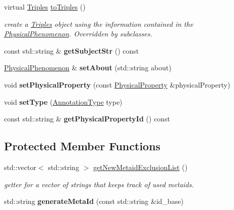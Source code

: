 \begin{DoxyCompactItemize}
virtual \hyperlink{classomexmeta_1_1Triples}{Triples} \hyperlink{classomexmeta_1_1PhysicalPhenomenon_a30617e685bd8b155a76d38ab5a9db273}{to\+Triples} ()
\begin{DoxyCompactList}\small\item\em create a \hyperlink{classomexmeta_1_1Triples}{Triples} object using the information contained in the \hyperlink{classomexmeta_1_1PhysicalPhenomenon}{Physical\+Phenomenon}. Overridden by subclasses. \end{DoxyCompactList}\item 
\mbox{\label{classomexmeta_1_1PhysicalPhenomenon_ae99e667cbceff2da0c4c0f5c64a8ba8f}} 
const std\+::string \& {\bfseries get\+Subject\+Str} () const
\item 
\mbox{\label{classomexmeta_1_1PhysicalPhenomenon_a0a9c54b0c4bfad62b618766474dc70f8}} 
\hyperlink{classomexmeta_1_1PhysicalPhenomenon}{Physical\+Phenomenon} \& {\bfseries set\+About} (std\+::string about)
\item 
\mbox{\label{classomexmeta_1_1PhysicalPhenomenon_afad41dbf096b22ab9b64441cb25e9db9}} 
void {\bfseries set\+Physical\+Property} (const \hyperlink{classomexmeta_1_1PhysicalProperty}{Physical\+Property} \&physical\+Property)
\item 
\mbox{\label{classomexmeta_1_1PhysicalPhenomenon_a4c27a0b0e430df95b3cffaf268973eec}} 
void {\bfseries set\+Type} (\hyperlink{namespaceomexmeta_a1129ebb8a92218ebb27b9c76ac8462f7}{Annotation\+Type} type)
\item 
\mbox{\label{classomexmeta_1_1PhysicalPhenomenon_aca53e0f8ce8139a919f48372b254a5d0}} 
const std\+::string \& {\bfseries get\+Physical\+Property\+Id} () const
\end{DoxyCompactItemize}
\subsection*{Protected Member Functions}
\begin{DoxyCompactItemize}
\item 
std\+::vector$<$ std\+::string $>$ \hyperlink{classomexmeta_1_1PhysicalPhenomenon_a54d90cf6db78e98bd091f478dc5bd74a}{get\+New\+Metaid\+Exclusion\+List} ()
\begin{DoxyCompactList}\small\item\em getter for a vector of strings that keeps track of used metaids. \end{DoxyCompactList}\item 
\mbox{\label{classomexmeta_1_1PhysicalPhenomenon_afe71a5c6399b992922eb6eeda6de49bd}} 
std\+::string {\bfseries generate\+Meta\+Id} (const std\+::string \&id\+\_\+base)
\end{DoxyCompactItemize}
